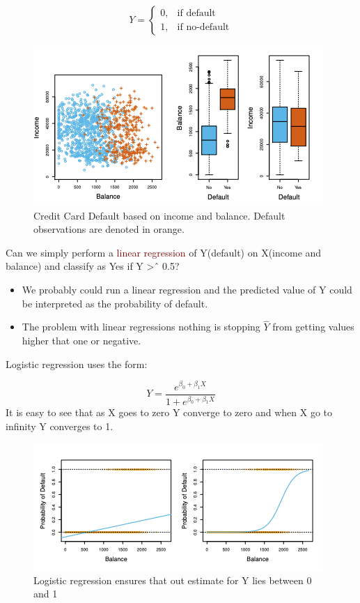 \documentclass{tufte-handout}
\newcommand{\hlred}[1]{\textcolor{Maroon}{#1}}%
\begin{document}
  \begin{equation}
    Y=
    \begin{cases}
      0, & \text{if default} \\
      1, & \text{if no-default}
    \end{cases}
  \end{equation}


 \begin{figure}
  \includegraphics{logistic.png}
  \caption{Credit Card Default based on income and balance. Default observations are denoted in orange.}
  \label{fig:textfig}
\end{figure}

Can we simply perform a \hlred{linear regression} of Y(default) on X(income and balance) and classify as Yes if Y >ˆ 0.5?

\begin{itemize}
    \item We probably could run a linear regression and the predicted value of Y could be interpreted as the probability of default. 
    \item The problem with linear regressions nothing is stopping \(\hat{Y}\) from getting values higher that one or negative.
\end{itemize}

Logistic regression uses the form:

\begin{equation}
    Y = \frac{e^{\beta_0+\beta_1X}}{{1+e^{\beta_0+\beta_1X}}}
\end{equation}
It is easy to see that as X goes to zero Y converge to zero and when X go to infinity Y converges to 1.

 \begin{figure}
  \includegraphics{log_1.png}
  \caption{Logistic regression ensures that out estimate for Y lies between 0 and 1}
  \label{fig:textfig}
\end{figure}
\end{document}
